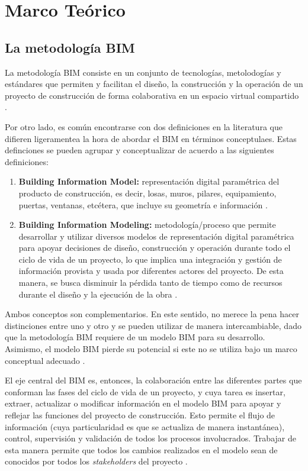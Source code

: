 \chapter{Marco Teórico}

\section{La metodología BIM}

La metodología BIM consiste en un conjunto de tecnologías, metolodogías y estándares que permiten y facilitan el diseño, la construcción y la operación de un proyecto de construcción de forma colaborativa en un espacio virtual compartido \cite{tabilo2019estudio}.

Por otro lado, es común encontrarse con dos definiciones en la literatura que difieren ligeramentea la hora de abordar el BIM en términos conceptulaes. Estas definciones se pueden agrupar y conceptualizar de acuerdo a las siguientes definiciones:

\begin{enumerate}
    \item \textbf{Building Information Model:} representación digital paramétrica del producto de construcción, es decir, losas, muros, pilares, equipamiento, puertas, ventanas, etcétera, que incluye su geometría e información \cite{lnb}.
    \item \textbf{Building Information Modeling:} metodología/proceso  que permite desarrollar y utilizar diversos modelos  de representación digital paramétrica para apoyar decisiones de diseño, construcción y operación durante todo el ciclo de vida de un proyecto, lo que implica una integración y gestión de información provista y usada por diferentes actores del proyecto. De esta manera, se busca disminuir la pérdida tanto de tiempo como de recursos durante el diseño y la ejecución de la obra \cite{bimforum}.
\end{enumerate}

Ambos conceptos son complementarios. En este sentido, no merece la pena hacer distinciones entre uno y otro y se pueden utilizar de manera intercambiable, dado que la metodología BIM requiere de un modelo BIM para su desarrollo. Asimismo, el modelo BIM pierde su potencial si este no se utiliza bajo un marco conceptual adecuado \cite{cardenas2016incorporacion}.

El eje central del BIM es, entonces, la colaboración entre las diferentes partes que conforman las fases del ciclo de vida de un proyecto, y cuya tarea es insertar, extraer, actualizar o modificar información en el modelo BIM para apoyar y reflejar las funciones del proyecto de construcción. Esto permite el flujo de información (cuya particularidad es que se actualiza de manera instantánea), control, supervisión y validación de todos los procesos involucrados. Trabajar de esta manera permite que todos los cambios realizados en el modelo sean de conocidos por todos los \textit{stakeholders} del proyecto \cite{trejo2018estudio}.

